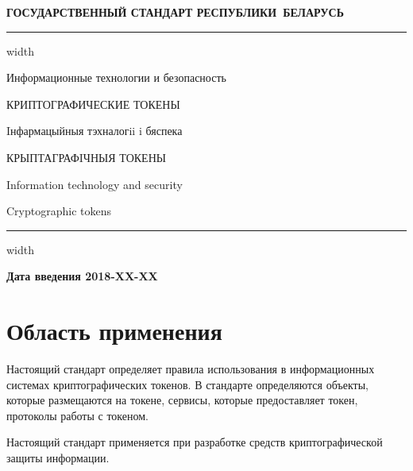 \newpage
\setcounter{page}{1}
\pagestyle{headings}

\begin{center}
{\bfseries
ГОСУДАРСТВЕННЫЙ СТАНДАРТ РЕСПУБЛИКИ~БЕЛАРУСЬ
\vskip 2pt
\hrule width\textwidth

\vskip 9pt

Информационные технологии и безопасность

КРИПТОГРАФИЧЕСКИЕ ТОКЕНЫ

\vskip 9pt

Iнфармацыйныя тэхналогii i бяспека

КРЫПТАГРАФIЧНЫЯ ТОКЕНЫ
} %

\vskip 9pt

Information technology and security

Cryptographic tokens

\vskip 4pt                
\hrule width \textwidth
\end{center}

\mbox{}\hfill{\bfseries Дата введения 2018-XX-XX}

\chapter{Область применения}

Настоящий стандарт определяет правила использования 
в информационных системах криптографических токенов.
%
В стандарте определяются объекты, которые размещаются на токене,
сервисы, которые предоставляет токен, протоколы работы с токеном.

Настоящий стандарт применяется при разработке средств криптографической 
защиты информации.

